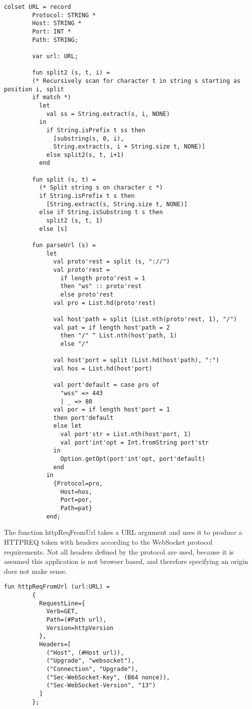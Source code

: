 		\begin{lstlisting}[label=lst:url,caption=URL Declarations,gobble=2]
		colset URL = record
		Protocol: STRING *
		Host: STRING *
		Port: INT *
		Path: STRING;
		
		var url: URL;
		
		fun split2 (s, t, i) =
		(* Recursively scan for character t in string s starting as position i, split
		if match *)
		  let
		    val ss = String.extract(s, i, NONE) 
		  in 
		    if String.isPrefix t ss then
		      [substring(s, 0, i), 
		      String.extract(s, i + String.size t, NONE)]
		    else split2(s, t, i+1)
		  end
		
		fun split (s, t) = 
		  (* Split string s on character c *)
		  if String.isPrefix t s then
		    [String.extract(s, String.size t, NONE)]
		  else if String.isSubstring t s then
		    split2 (s, t, 1)
		  else [s]
		
		fun parseUrl (s) = 
			let
			  val proto'rest = split (s, "://")
			  val proto'rest = 
			    if length proto'rest = 1 
			    then "ws" :: proto'rest 
			    else proto'rest 
			  val pro = List.hd(proto'rest)
			
			  val host'path = split (List.nth(proto'rest, 1), "/")
			  val pat = if length host'path = 2
			    then "/" ^ List.nth(host'path, 1)
			    else "/"
			  
			  val host'port = split (List.hd(host'path), ":")
			  val hos = List.hd(host'port)
			
			  val port'default = case pro of
			    "wss" => 443
			    | _ => 80
			  val por = if length host'port = 1 
			  then port'default
			  else let
			    val port'str = List.nth(host'port, 1)
			    val port'int'opt = Int.fromString port'str
			  in
			    Option.getOpt(port'int'opt, port'default)
			  end
			in
			  {Protocol=pro, 
			    Host=hos, 
			    Port=por, 
			    Path=pat}
			end;
		\end{lstlisting}
		
		The function httpReqFromUrl takes a URL argument and uses it to produce a
		HTTPREQ token with headers according to the WebSocket protocol requirements.
		Not all headers defined by the protocol are used, because it is assumed this
		application is not browser based, and therefore specifying an origin does not
		make sense. 
		
		\begin{lstlisting}[label=lst:httpReqFromUrl,caption=httpReqFromUrl,gobble=2]
		fun httpReqFromUrl (url:URL) = 
		{
		  RequestLine={
		    Verb=GET, 
		    Path=(#Path url),
		    Version=httpVersion
		  },
		  Headers=[
		    ("Host", (#Host url)),
		    ("Upgrade", "websocket"),
		    ("Connection", "Upgrade"),
		    ("Sec-WebSocket-Key", (B64 nonce)),
		    ("Sec-WebSocket-Version", "13")
		  ]
		};
		\end{lstlisting}
		
